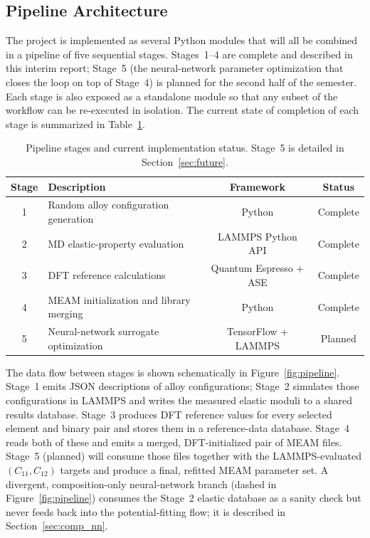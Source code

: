 \projectprogress
\label{sec:progress}

\subsection{Pipeline Architecture}
The project is implemented as several Python modules that will all be combined
in a pipeline of five sequential stages. Stages~1--4 are complete and described
in this interim report; Stage~5 (the neural-network parameter optimization that
closes the loop on top of Stage~4) is planned for the second half of the
semester. Each stage is also exposed as a standalone module so that any subset
of the workflow can be re-executed in isolation. The current state of
completion of each stage is summarized in Table~\ref{tab:pipeline_status}.

\begin{table}[h]
	\centering
	\caption{Pipeline stages and current implementation status. Stage~5
	is detailed in Section~\ref{sec:future}.}
	\label{tab:pipeline_status}
	\renewcommand{\arraystretch}{1.2}
	\begin{tabular}{|c|p{6.5cm}|c|c|}
		\hline
		\textbf{Stage} & \textbf{Description} & \textbf{Framework} & \textbf{Status} \\ \hline
		1 & Random alloy configuration generation     & Python                       & Complete \\ \hline
		2 & MD elastic-property evaluation             & LAMMPS Python API            & Complete \\ \hline
		3 & DFT reference calculations                  & Quantum Espresso + ASE       & Complete \\ \hline
		4 & MEAM initialization and library merging     & Python                       & Complete \\ \hline
		5 & Neural-network surrogate optimization       & TensorFlow + LAMMPS          & Planned \\ \hline
	\end{tabular}
\end{table}

The data flow between stages is shown schematically in
Figure~\ref{fig:pipeline}. Stage~1 emits JSON descriptions of alloy
configurations; Stage~2 simulates those configurations in LAMMPS and writes the
measured elastic moduli to a shared results database. Stage~3 produces DFT
reference values for every selected element and binary pair and stores them in
a reference-data database. Stage~4 reads both of these and emits a merged,
DFT-initialized pair of MEAM files. Stage~5 (planned) will consume those
files together with the LAMMPS-evaluated $(C_{11},C_{12})$ targets and
produce a final, refitted MEAM parameter set. A divergent, composition-only
neural-network branch (dashed in Figure~\ref{fig:pipeline}) consumes the
Stage~2 elastic database as a sanity check but never feeds back into the
potential-fitting flow; it is described in Section~\ref{sec:comp_nn}.

